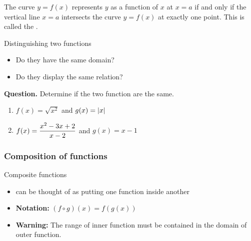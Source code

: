 \documentclass[10pt,t,presentation,ignorenonframetext,aspectratio=169]{beamer}
\begin{document}
\begin{frame}
\begin{center}
  \end{center}
\end{frame}

\begin{frame}
  \vs
  \begin{theorem}
    The curve $y=f(x)$ represents $y$ as a function of $x$ at $x=a$ if and
    only if the vertical line $x=a$ intersects the curve $y=f(x)$ at
    exactly one point. This is called the .
  \end{theorem}
\end{frame}

\begin{frame}
  \vs
  \begin{block}{Distinguishing two functions}
    \begin{itemize}
    \item Do they have the same domain?
    \item Do they display the same relation?
    \end{itemize}
  \end{block}

  \vs
  \textbf{Question.} Determine if the two function are the same.
  \begin{enumerate}
  \item $f(x) = \sqrt{x^2}$ and  $g(x) = \left|x\right|$ \vfill
  \item $\displaystyle f(x) = \frac{x^2-3x+2}{x-2}$ and $g(x) = x-1$ \vfill
  \end{enumerate}
\end{frame}

\begin{frame}
  \frametitle{Composition of functions}
  \begin{block}{Composite functions}
    \begin{itemize}
    \item can be thought of as putting one function inside another
    \item \textbf{Notation:} $( f \circ g) (x) = f(g(x))$
    \item \textbf{Warning:} The range of inner function must be
      contained in the domain of outer function.
    \end{itemize}
  \end{block}
\end{frame}
\end{document}
